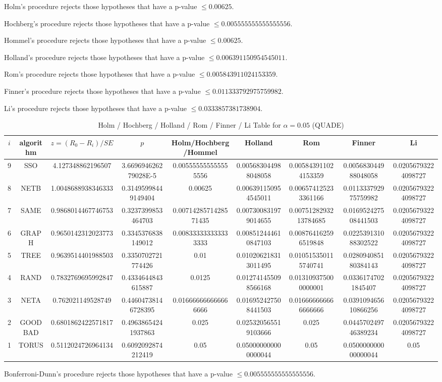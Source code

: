 \documentclass[a4paper,10pt]{article}
\begin{document}
\begin{landscape}
Holm's procedure rejects those hypotheses that have a p-value $\le0.00625$.


Hochberg's procedure rejects those hypotheses that have a p-value $\le0.005555555555555556$.


Hommel's procedure rejects those hypotheses that have a p-value $\le0.00625$.


Holland's procedure rejects those hypotheses that have a p-value $\le0.006391150954545011$.


Rom's procedure rejects those hypotheses that have a p-value $\le0.005843911024153359$.


Finner's procedure rejects those hypotheses that have a p-value $\le0.011333792975759982$.


Li's procedure rejects those hypotheses that have a p-value $\le0.0333857381738904$.



\newpage

\begin{table}[!htp]
\centering\scriptsize
\caption{Holm / Hochberg / Holland / Rom / Finner / Li Table for $\alpha=0.05$ (QUADE)}
\begin{tabular}{ccccccccc}
$i$&algorithm&$z=(R_0 - R_i)/SE$&$p$&Holm/Hochberg/Hommel&Holland&Rom&Finner&Li\\
\hline
9& SSO&4.127348862196507&3.669694626279028E-5&0.005555555555555556&0.005683044988048058&0.005843911024153359&0.005683044988048058&0.02056793224098727\\
8& NETB&1.0048688938346333&0.31495998449149404&0.00625&0.006391150954545011&0.006574125233361166&0.011333792975759982&0.02056793224098727\\
7& SAME&0.9868014467746753&0.3237399853464703&0.0071428571428571435&0.007300831979014655&0.0075128293213784685&0.016952427508441503&0.02056793224098727\\
6& GRAPH&0.9650142312023773&0.3345376838149012&0.008333333333333333&0.008512444610847103&0.008764162596519848&0.022539131088302522&0.02056793224098727\\
5& TREE&0.9639514401988503&0.3350702721774426&0.01&0.010206218313011495&0.010515350115740741&0.028094085180384143&0.02056793224098727\\
4& RAND&0.7832769695992847&0.4334644843615887&0.0125&0.012741455098566168&0.013109375000000001&0.03361747021845407&0.02056793224098727\\
3& NETA&0.762021149528749&0.44604738146728395&0.016666666666666666&0.016952427508441503&0.016666666666666666&0.039109465610866256&0.02056793224098727\\
2& GOODBAD&0.6801862422571817&0.49638654241937863&0.025&0.025320565519103666&0.025&0.044570249746389234&0.02056793224098727\\
1& TORUS&0.5112024726964134&0.6092092874212419&0.05&0.050000000000000044&0.05&0.050000000000000044&0.05\\
\hline
\end{tabular}
\end{table}
Bonferroni-Dunn's procedure rejects those hypotheses that have a p-value $\le0.005555555555555556$.



\end{landscape}
\end{document}
